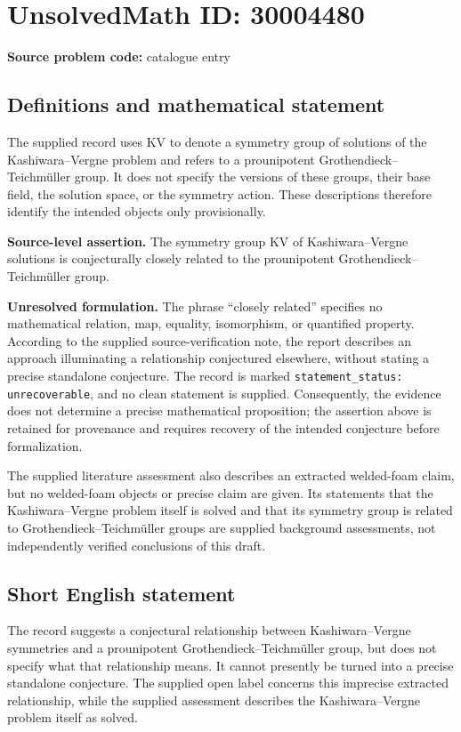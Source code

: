 \documentclass[11pt]{article}
\begin{document}
\section*{UnsolvedMath ID: 30004480}
\textbf{Source problem code:} catalogue entry
\subsection{Definitions and mathematical statement}
The supplied record uses \(\mathrm{KV}\) to denote a symmetry group of solutions of the Kashiwara--Vergne problem and refers to a prounipotent Grothendieck--Teichm\"uller group. It does not specify the versions of these groups, their base field, the solution space, or the symmetry action. These descriptions therefore identify the intended objects only provisionally.

\textbf{Source-level assertion.} The symmetry group \(\mathrm{KV}\) of Kashiwara--Vergne solutions is conjecturally closely related to the prounipotent Grothendieck--Teichm\"uller group.

\textbf{Unresolved formulation.} The phrase ``closely related'' specifies no mathematical relation, map, equality, isomorphism, or quantified property. According to the supplied source-verification note, the report describes an approach illuminating a relationship conjectured elsewhere, without stating a precise standalone conjecture. The record is marked \texttt{statement\_status: unrecoverable}, and no clean statement is supplied. Consequently, the evidence does not determine a precise mathematical proposition; the assertion above is retained for provenance and requires recovery of the intended conjecture before formalization.

The supplied literature assessment also describes an extracted welded-foam claim, but no welded-foam objects or precise claim are given. Its statements that the Kashiwara--Vergne problem itself is solved and that its symmetry group is related to Grothendieck--Teichm\"uller groups are supplied background assessments, not independently verified conclusions of this draft.
\subsection{Short English statement}
The record suggests a conjectural relationship between Kashiwara--Vergne symmetries and a prounipotent Grothendieck--Teichm\"uller group, but does not specify what that relationship means. It cannot presently be turned into a precise standalone conjecture. The supplied open label concerns this imprecise extracted relationship, while the supplied assessment describes the Kashiwara--Vergne problem itself as solved.
\end{document}
